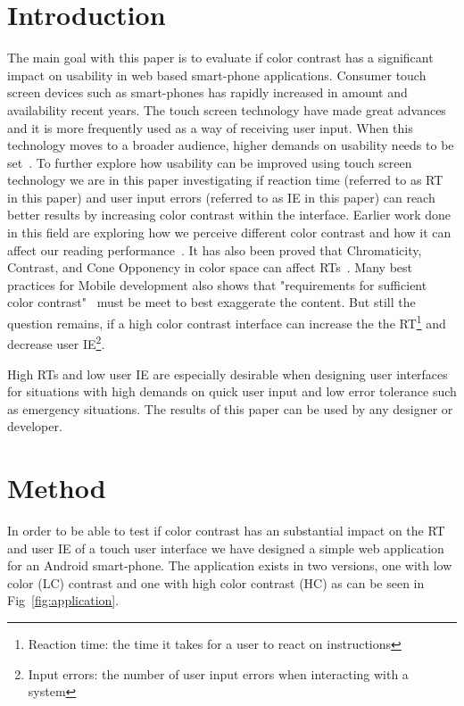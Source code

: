 \documentclass[runningheads,a4paper]{llncs}
\begin{document}
\section{Introduction}
The main goal with this paper is to evaluate if color contrast has a significant impact on usability in web based smart-phone applications. Consumer touch screen devices such as smart-phones has rapidly increased in amount and availability recent years. The touch screen technology have made great advances ~\cite{jennings2013touch} and it is more frequently used as a way of receiving user input. When this technology moves to a broader audience, higher demands on usability needs to be set~\cite{gong2004guidelines}. To further explore how usability can be improved using touch screen technology we are in this paper investigating if reaction time (referred to as RT in this paper) and user input errors (referred to as IE in this paper) can reach better results by increasing color contrast within the interface. Earlier work done in this field are exploring how we perceive different color contrast and how it can affect our reading performance~\cite{wu2003improving}. It has also been proved that Chromaticity, Contrast, and Cone Opponency in color space can affect RTs~\cite{mckeefry2003simple}. Many best practices for Mobile development also shows that "requirements for sufficient color contrast"~\cite{marcus2013design} must be meet to best exaggerate the content. But still the question remains, if a high color contrast interface can increase the the RT\footnote{Reaction time: the time it takes for a user to react on instructions} and decrease user IE\footnote{Input errors: the number of user input errors when interacting with a system}.

High RTs and low user IE are especially desirable when designing user interfaces for situations with high demands on quick user input and low error tolerance such as emergency situations. The results of this paper can be used by any designer or developer.

\section{Method}
In order to be able to test if color contrast has an substantial impact on the RT and user IE of a touch user interface we have designed a simple web application for an Android smart-phone. The application exists in two versions, one with low color (LC) contrast and one with high color contrast (HC) as can be seen in Fig~\ref{fig:application}.
\end{document}

